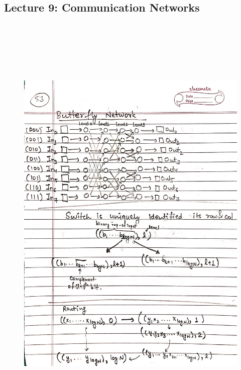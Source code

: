\newpage
{\color{black} \subsection*{Lecture 9: Communication Networks}}
\begin{figure}[H]
    \centering
    \includegraphics[width=16cm, height=21cm]{"./MIT-6.042J/MIT-6042J-053"}
\end{figure}

